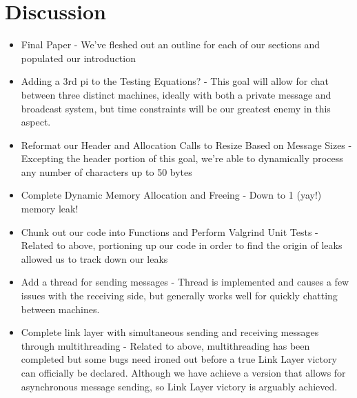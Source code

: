 \documentclass{article}
\begin{document}
\section*{Discussion}
\begin{itemize}
\item Final Paper - We've fleshed out an outline for each of our sections and populated our introduction
\item Adding a 3rd pi to the Testing Equations? - This goal will allow for chat between three distinct machines, ideally with both a private message and broadcast system, but time constraints will be our greatest enemy in this aspect.
\item Reformat our Header and Allocation Calls to Resize Based on Message Sizes - Excepting the header portion of this goal, we're able to dynamically process any number of characters up to 50 bytes
\item Complete Dynamic Memory Allocation and Freeing - Down to 1 (yay!) memory leak!
\item Chunk out our code into Functions and Perform Valgrind Unit Tests - Related to above, portioning up our code in order to find the origin of leaks allowed us to track down our leaks
\item Add a thread for sending messages - Thread is implemented and causes a few issues with the receiving side, but generally works well for quickly chatting between machines.
\item Complete link layer with simultaneous sending and receiving messages through multithreading - Related to above, multithreading has been completed but some bugs need ironed out before a true Link Layer victory can officially be declared. Although we have achieve a version that allows for asynchronous message sending, so Link Layer victory is arguably achieved. 
\end{itemize}
\end{document}
